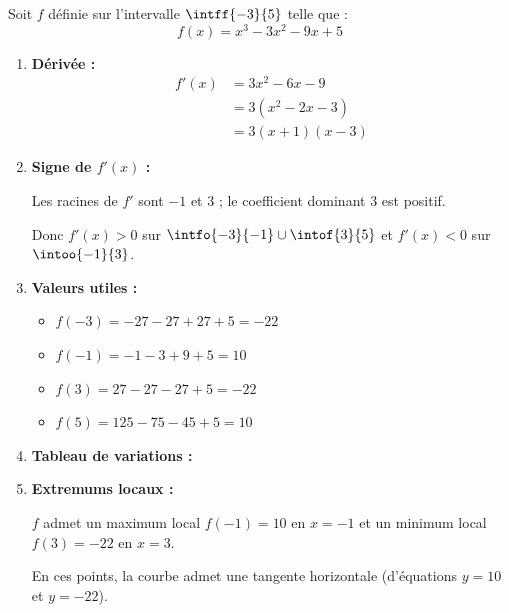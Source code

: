 \begin{methode}
	Soit $f$ définie sur l'intervalle $\intff{-3}{5}$ telle que :
	\[
		f(x) = x^3 - 3x^2 - 9x + 5
	\]

	\begin{enumerate}
		\item \textbf{Dérivée :}
		      \[
			      \begin{aligned}
				      f'(x) & = 3x^2 - 6x - 9   \\
				            & = 3(x^2 - 2x - 3) \\
				            & = 3(x + 1)(x - 3)
			      \end{aligned}
		      \]

		\item \textbf{Signe de $f'(x)$ :}

		      Les racines de $f'$ sont $-1$ et $3$ ; le coefficient dominant $3$ est positif.

		      Donc $f'(x) > 0$ sur $\intfo{-3}{-1} \cup \intof{3}{5}$ et $f'(x) < 0$ sur $\intoo{-1}{3}$.

		\item \textbf{Valeurs utiles :}
		      \begin{itemize}
			      \item $f(-3) = -27 - 27 + 27 + 5 = -22$
			      \item $f(-1) = -1 - 3 + 9 + 5 = 10$
			      \item $f(3) = 27 - 27 - 27 + 5 = -22$
			      \item $f(5) = 125 - 75 - 45 + 5 = 10$
		      \end{itemize}

		\item \textbf{Tableau de variations :}
		      \begin{center}
		      \end{center}
		\item \textbf{Extremums locaux :}

		      $f$ admet un maximum local $f(-1) = 10$ en $x = -1$ et un minimum local $f(3) = -22$ en $x = 3$.

		      En ces points, la courbe admet une tangente horizontale (d'équations $y = 10$ et $y = -22$).
	\end{enumerate}


\end{methode}
